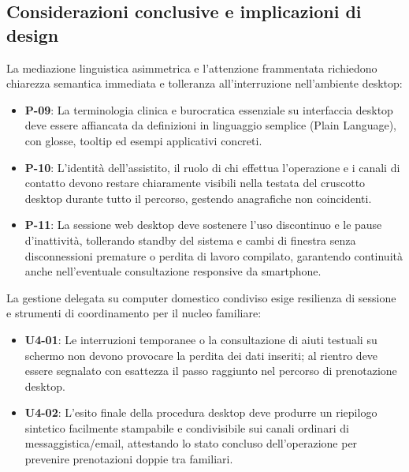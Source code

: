 \subsection[Implicazioni progettuali]{Considerazioni conclusive e implicazioni di design}
\vspace{-2pt}
La mediazione linguistica asimmetrica e l'attenzione frammentata richiedono chiarezza semantica immediata e tolleranza all'interruzione nell'ambiente desktop:
\begin{itemize}[leftmargin=*,topsep=1.5pt,itemsep=0.5pt,parsep=0pt]
\item \hypertarget{req:P-09}{}\textbf{P-09}: La terminologia clinica e burocratica essenziale su interfaccia desktop deve essere affiancata da definizioni in linguaggio semplice (Plain Language), con glosse, tooltip ed esempi applicativi concreti.
\item \hypertarget{req:P-10}{}\textbf{P-10}: L'identità dell'assistito, il ruolo di chi effettua l'operazione e i canali di contatto devono restare chiaramente visibili nella testata del cruscotto desktop durante tutto il percorso, gestendo anagrafiche non coincidenti.
\item \hypertarget{req:P-11}{}\textbf{P-11}: La sessione web desktop deve sostenere l'uso discontinuo e le pause d'inattività, tollerando standby del sistema e cambi di finestra senza disconnessioni premature o perdita di lavoro compilato, garantendo continuità anche nell'eventuale consultazione responsive da smartphone.
\end{itemize}

La gestione delegata su computer domestico condiviso esige resilienza di sessione e strumenti di coordinamento per il nucleo familiare:
\begin{itemize}[leftmargin=*,topsep=1.5pt,itemsep=0.5pt,parsep=0pt]
\item \hypertarget{req:U4-01}{}\textbf{U4-01}: Le interruzioni temporanee o la consultazione di aiuti testuali su schermo non devono provocare la perdita dei dati inseriti; al rientro deve essere segnalato con esattezza il passo raggiunto nel percorso di prenotazione desktop.
\item \hypertarget{req:U4-02}{}\textbf{U4-02}: L'esito finale della procedura desktop deve produrre un riepilogo sintetico facilmente stampabile e condivisibile sui canali ordinari di messaggistica/email, attestando lo stato concluso dell'operazione per prevenire prenotazioni doppie tra familiari.
\end{itemize}


